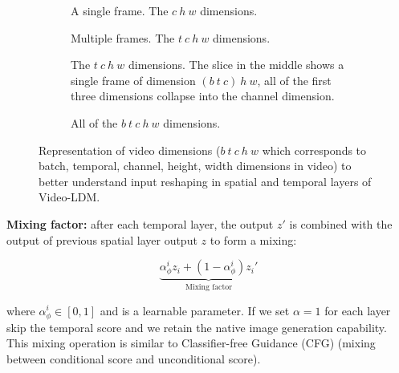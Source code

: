 \begin{figure}
    \centering

    \begin{subfigure}{0.3\textwidth}
        \centering
        \scalebox{0.6}{
            
        }
        \caption{A single frame. The $c\ h\ w$ dimensions.}
    \end{subfigure}

    \begin{subfigure}{0.3\textwidth}
        \centering
        \scalebox{0.6}{
            
        }
        \caption{Multiple frames. The $t\ c\ h\ w$ dimensions.}
    \end{subfigure}

    \begin{subfigure}{0.7\textwidth}
        \centering
        \scalebox{0.6}{
            
        }
        \caption{The $t\ c\ h\ w$ dimensions. The slice in the middle shows a single frame of dimension $(b\ t\ c)\ h\ w$, all of the first three dimensions collapse into the channel dimension.}
    \end{subfigure}

    \begin{subfigure}{0.7\textwidth}
        \centering
        \scalebox{0.6}{
            
        }
        \caption{All of the $b\ t\ c\ h\ w$ dimensions. }
    \end{subfigure}

    \caption{Representation of video dimensions ($b\ t\ c\ h\ w$ which corresponds to batch, temporal, channel, height, width dimensions in video) to better understand input reshaping in spatial and temporal layers of Video-LDM.}
\end{figure}





\textbf{Mixing factor:} after each temporal layer, the output $z'$ is combined with the output of previous spatial layer output $z$ to form a mixing: 

\[ \underbrace{\alpha_\phi^i z_{i} + (1 - \alpha_\phi^i) z_{i}'}_{\text{Mixing factor}} \] 

where $\alpha_\phi^i \in [0, 1]$ and is a learnable parameter. If we set $\alpha = 1$ for each layer skip the temporal score and we retain the native image generation capability. This mixing operation is similar to Classifier-free Guidance (CFG) (mixing between conditional score and unconditional score).

